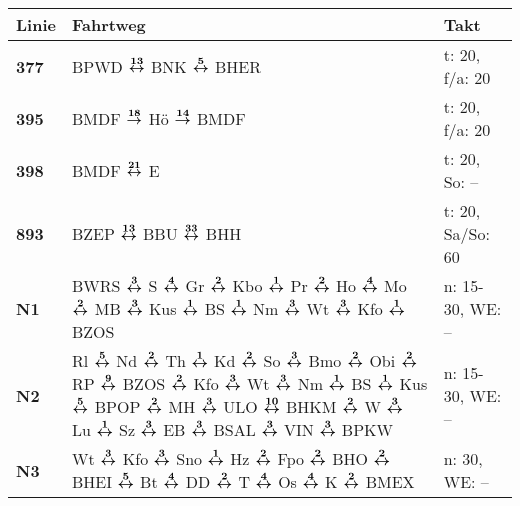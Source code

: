 \begin{minipage}[t]{0.45\textwidth}
\begin{tabular}{>{\bfseries}L{1.2cm}L{9.0cm}L{3.0cm}}
{\bfseries Linie} & {\bfseries Fahrtweg} & {\bfseries Takt} \\
\hline
\bus{} 377    & BPWD $\xarwe{13}$ BNK $\xarwe{5}$ BHER                                                                                                                              & t: 20, f/a: 20             \\
\bus{} 395    & BMDF $\xarre{18}$ Hö $\xarre{14}$ BMDF                                                                                                                              & t: 20, f/a: 20             \\
\bus{} 398    & BMDF $\xarwe{21}$ E                                                                                                                                                 & t: 20, So: --              \\
\bus{} 893    & BZEP $\xarwe{13}$ BBU $\xarwe{33}$ BHH                                                                                                                              & t: 20, Sa/So: 60           \\
\nbus{} N1    & BWRS $\xarwe{3}$ S $\xarwe{4}$ Gr $\xarwe{2}$ Kbo $\xarwe{1}$ Pr $\xarwe{2}$ Ho $\xarwe{4}$ Mo $\xarwe{2}$ MB $\xarwe{3}$ Kus $\xarwe{1}$ BS $\xarwe{1}$ Nm         %
                $\xarwe{3}$ Wt $\xarwe{3}$ Kfo $\xarwe{1}$ BZOS                                                                                                                     & n: 15-30, WE: --           \\
\nbus{} N2    & Rl $\xarwe{5}$ Nd $\xarwe{2}$ Th $\xarwe{1}$ Kd $\xarwe{2}$ So $\xarwe{3}$ Bmo $\xarwe{2}$ Obi $\xarwe{2}$ RP $\xarwe{9}$ BZOS $\xarwe{2}$ Kfo $\xarwe{3}$ Wt       %
                $\xarwe{3}$ Nm $\xarwe{1}$ BS $\xarwe{1}$ Kus $\xarwe{5}$ BPOP $\xarwe{2}$ MH $\xarwe{3}$ ULO $\xarwe{10}$ BHKM $\xarwe{2}$ W $\xarwe{3}$ Lu $\xarwe{1}$ Sz         %
                $\xarwe{3}$ EB $\xarwe{3}$ BSAL $\xarwe{3}$ VIN $\xarwe{3}$ BPKW                                                                                                    & n: 15-30, WE: --           \\
\nbus{} N3    & Wt $\xarwe{3}$ Kfo $\xarwe{3}$ Sno $\xarwe{1}$ Hz $\xarwe{2}$ Fpo $\xarwe{2}$ BHO $\xarwe{2}$ BHEI $\xarwe{5}$ Bt $\xarwe{4}$ DD $\xarwe{2}$ T $\xarwe{4}$ Os       %
                $\xarwe{4}$ K $\xarwe{2}$ BMEX                                                                                                                                      & n: 30, WE: --              \\

\end{tabular}
\end{minipage}
